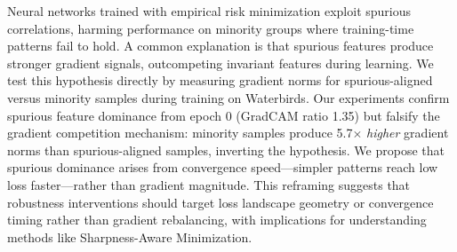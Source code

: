 Neural networks trained with empirical risk minimization exploit spurious correlations, harming performance on minority groups where training-time patterns fail to hold. A common explanation is that spurious features produce stronger gradient signals, outcompeting invariant features during learning. We test this hypothesis directly by measuring gradient norms for spurious-aligned versus minority samples during training on Waterbirds. Our experiments confirm spurious feature dominance from epoch 0 (GradCAM ratio 1.35) but falsify the gradient competition mechanism: minority samples produce 5.7$\times$ \emph{higher} gradient norms than spurious-aligned samples, inverting the hypothesis. We propose that spurious dominance arises from convergence speed---simpler patterns reach low loss faster---rather than gradient magnitude. This reframing suggests that robustness interventions should target loss landscape geometry or convergence timing rather than gradient rebalancing, with implications for understanding methods like Sharpness-Aware Minimization.
